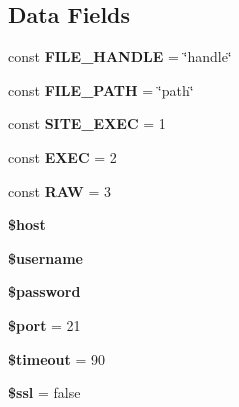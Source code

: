 \subsection*{Data Fields}
\begin{DoxyCompactItemize}
\item 
\hypertarget{class_f_t_p_client_a5c96dd102721ec8d215ecb67a668761b}{
const {\bfseries FILE\_\-HANDLE} = \char`\"{}handle\char`\"{}}
\label{class_f_t_p_client_a5c96dd102721ec8d215ecb67a668761b}

\item 
\hypertarget{class_f_t_p_client_a8df70f66519ce5f2724a88ae7cd4adcd}{
const {\bfseries FILE\_\-PATH} = \char`\"{}path\char`\"{}}
\label{class_f_t_p_client_a8df70f66519ce5f2724a88ae7cd4adcd}

\item 
\hypertarget{class_f_t_p_client_a497e112a3bd77a87bd87a1ad44287c07}{
const {\bfseries SITE\_\-EXEC} = 1}
\label{class_f_t_p_client_a497e112a3bd77a87bd87a1ad44287c07}

\item 
\hypertarget{class_f_t_p_client_a89f4b08f023dda747b77fdf0234fd57c}{
const {\bfseries EXEC} = 2}
\label{class_f_t_p_client_a89f4b08f023dda747b77fdf0234fd57c}

\item 
\hypertarget{class_f_t_p_client_ac8b2ab99e4ae0ff97ec02ae3d5450741}{
const {\bfseries RAW} = 3}
\label{class_f_t_p_client_ac8b2ab99e4ae0ff97ec02ae3d5450741}

\item 
\hypertarget{class_f_t_p_client_a711797613cb863ca0756df789c396bf2}{
{\bfseries \$host}}
\label{class_f_t_p_client_a711797613cb863ca0756df789c396bf2}

\item 
\hypertarget{class_f_t_p_client_a0eb82aa5f81cf845de4b36cd653c42cf}{
{\bfseries \$username}}
\label{class_f_t_p_client_a0eb82aa5f81cf845de4b36cd653c42cf}

\item 
\hypertarget{class_f_t_p_client_a607686ef9f99ea7c42f4f3dd3dbb2b0d}{
{\bfseries \$password}}
\label{class_f_t_p_client_a607686ef9f99ea7c42f4f3dd3dbb2b0d}

\item 
\hypertarget{class_f_t_p_client_aa0787efab4b22e8a212882f3409d4c77}{
{\bfseries \$port} = 21}
\label{class_f_t_p_client_aa0787efab4b22e8a212882f3409d4c77}

\item 
\hypertarget{class_f_t_p_client_a84320a9bf3e591d7ae20dfcb0dfe6a0d}{
{\bfseries \$timeout} = 90}
\label{class_f_t_p_client_a84320a9bf3e591d7ae20dfcb0dfe6a0d}

\item 
\hypertarget{class_f_t_p_client_a10c5b56c377e4f3a08f69704e49c87e6}{
{\bfseries \$ssl} = false}
\label{class_f_t_p_client_a10c5b56c377e4f3a08f69704e49c87e6}

\end{DoxyCompactItemize}
